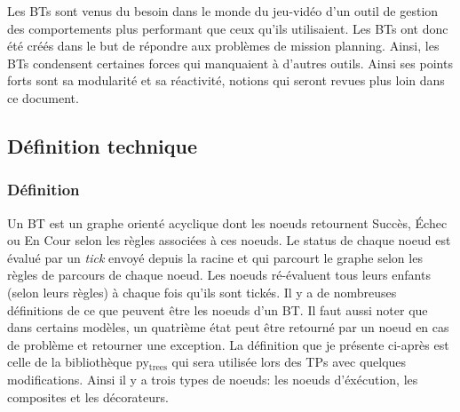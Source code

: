 \documentclass[11pt]{article}
\begin{document}
Les BTs sont venus du besoin dans le monde du jeu-vidéo d'un outil de gestion des comportements plus performant que ceux qu'ils utilisaient.
Les BTs ont donc été créés dans le but de répondre aux problèmes de mission planning.
Ainsi, les BTs condensent certaines forces qui manquaient à d'autres outils.
Ainsi ses points forts sont sa modularité et sa réactivité, notions qui seront revues plus loin dans ce document. 

\subsection{Définition technique}
\label{sec-2-1}
\subsubsection{Définition}
\label{sec-2-1-1}
Un BT est un graphe orienté acyclique dont les noeuds retournent Succès, Échec ou En Cour selon les règles associées à ces noeuds.
Le status de chaque noeud est évalué par un \emph{tick} envoyé depuis la racine et qui parcourt le graphe selon les règles de parcours de chaque noeud.
Les noeuds ré-évaluent tous leurs enfants (selon leurs règles) à chaque fois qu'ils sont tickés.
Il y a de nombreuses définitions de ce que peuvent être les noeuds d'un BT.
Il faut aussi noter que dans certains modèles, un quatrième état peut être retourné par un noeud en cas de problème et retourner une exception.
La définition que je présente ci-après est celle de la bibliothèque py$_{\text{trees}}$ qui sera utilisée lors des TPs avec quelques modifications.
Ainsi il y a trois types de noeuds: les noeuds d'éxécution, les composites et les décorateurs.
\end{document}

